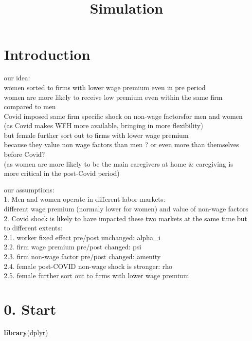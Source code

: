 \documentclass[
]{article}
\title{Simulation}
\author{}
\date{\vspace{-2.5em}}
\newenvironment{Shaded}{\begin{snugshade}}{\end{snugshade}}
\newcommand{\FunctionTok}[1]{\textcolor[rgb]{0.13,0.29,0.53}{\textbf{#1}}}
\newcommand{\NormalTok}[1]{#1}
\begin{document}
\maketitle

\section{Introduction}\label{introduction}

our idea:\\
women sorted to firms with lower wage premium even in pre period\\
women are more likely to receive low premium even within the same firm
compared to men\\
Covid imposed same firm specific shock on non-wage factorsfor men and
women\\
(as Covid makes WFH more available, bringing in more flexibility)\\
but female further sort out to firms with lower wage premium\\
because they value non wage factors than men ? or even more than
themselves before Covid?\\
(as women are more likely to be the main caregivers at home \&
caregiving is more critical in the post-Covid period)

our assumptions:\\
1. Men and women operate in different labor markets:\\
different wage premium (normaly lower for women) and value of non-wage
factors\\
2. Covid shock is likely to have impacted these two markets at the same
time but to different extents:\\
2.1. worker fixed effect pre/post unchanged: alpha\_i\\
2.2. firm wage premium pre/post changed: psi\\
2.3. firm non-wage factor pre/post changed: amenity\\
2.4. female post-COVID non-wage shock is stronger: rho\\
2.5. female further sort out to firms with lower wage premium

\section{0. Start}\label{start}

\begin{Shaded}
\begin{Highlighting}[]
\FunctionTok{library}\NormalTok{(dplyr)}
\end{Highlighting}
\end{Shaded}
\end{document}

